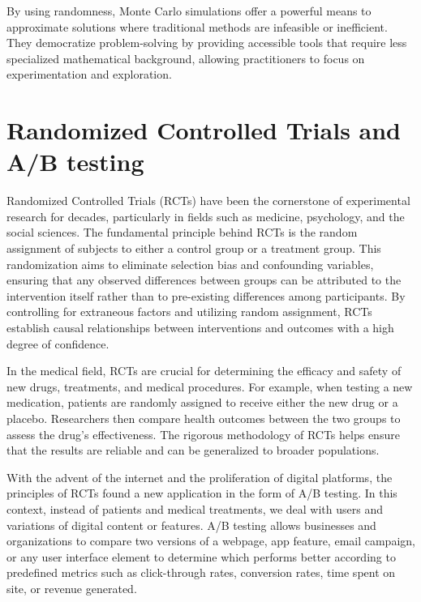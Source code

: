 \documentclass[final,5p,times,twocolumn,authoryear]{elsarticle}
\begin{document}
By using randomness, Monte Carlo simulations offer a powerful means to approximate solutions where traditional methods are infeasible or inefficient. They democratize problem-solving by providing accessible tools that require less specialized mathematical background, allowing practitioners to focus on experimentation and exploration.


\section{Randomized Controlled Trials and A/B testing}

Randomized Controlled Trials (RCTs) have been the cornerstone of experimental research for decades, particularly in fields such as medicine, psychology, and the social sciences. The fundamental principle behind RCTs is the random assignment of subjects to either a control group or a treatment group. This randomization aims to eliminate selection bias and confounding variables, ensuring that any observed differences between groups can be attributed to the intervention itself rather than to pre-existing differences among participants. By controlling for extraneous factors and utilizing random assignment, RCTs establish causal relationships between interventions and outcomes with a high degree of confidence.

In the medical field, RCTs are crucial for determining the efficacy and safety of new drugs, treatments, and medical procedures. For example, when testing a new medication, patients are randomly assigned to receive either the new drug or a placebo. Researchers then compare health outcomes between the two groups to assess the drug's effectiveness. The rigorous methodology of RCTs helps ensure that the results are reliable and can be generalized to broader populations.

With the advent of the internet and the proliferation of digital platforms, the principles of RCTs found a new application in the form of A/B testing. In this context, instead of patients and medical treatments, we deal with users and variations of digital content or features. A/B testing allows businesses and organizations to compare two versions of a webpage, app feature, email campaign, or any user interface element to determine which performs better according to predefined metrics such as click-through rates, conversion rates, time spent on site, or revenue generated.
\end{document}
